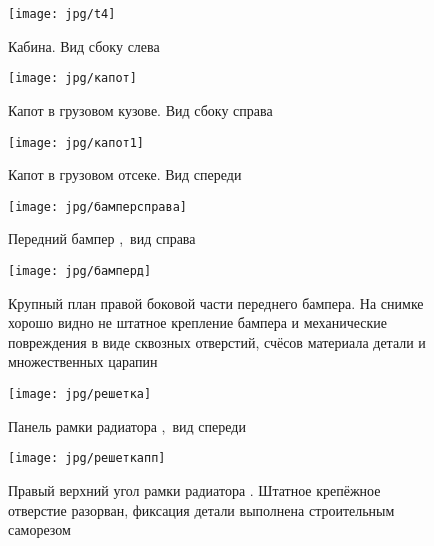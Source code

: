 {   \begin{figure}[H]
   	\centering
   	\texttt{[image: jpg/t4]}
   	\caption{{\footnotesize {Кабина. Вид сбоку слева}}}
   	\label{слева}
   \end{figure}
   
   
   
    
   
      \begin{figure}[H]
   	\centering
   	\texttt{[image: jpg/капот]}
   	\caption{{\footnotesize {Капот в грузовом кузове. Вид сбоку справа}}}
   	\label{капот1}
   \end{figure}
   
   
   
   
   
   
       \begin{figure}[H]
   	\centering
   	\texttt{[image: jpg/капот1]}
   	\caption{{\footnotesize {Капот в грузовом отсеке. Вид спереди}}}
   	\label{капот2}
   \end{figure}
   
   
   
   
   
   \begin{figure}[H]\centering
   	\parbox[t]{0.49\textwidth}
   	{\centering
   		\texttt{[image: jpg/бамперсправа]}
   		\caption{\footnotesize {Передний бампер ,\, вид справа }}
   		\label{бампер}}
   	\hfil \hfil
   	\parbox[t]{0.49\textwidth}
   	{\centering
   		\texttt{[image: jpg/бамперд]}
   		\caption{\footnotesize {Крупный план правой боковой части переднего бампера. На снимке хорошо видно не штатное крепление бампера и механические повреждения в виде сквозных отверстий, счёсов материала детали и множественных царапин}}
   		\label{бампер1}}
   \end{figure}





\begin{figure}[H]\centering
	\parbox[t]{0.49\textwidth}
	{\centering
		\texttt{[image: jpg/решетка]}
		\caption{\footnotesize {Панель рамки радиатора ,\, вид спереди}}
		\label{рамкарадиатора}}
	\hfil \hfil
	\parbox[t]{0.49\textwidth}
	{\centering
		\texttt{[image: jpg/решеткапп]}
		\caption{\footnotesize {Правый верхний угол рамки радиатора \tc. Штатное крепёжное отверстие разорван, фиксация детали выполнена строительным саморезом}}
		\label{рамкарадиатора2}}
\end{figure}
   
}
